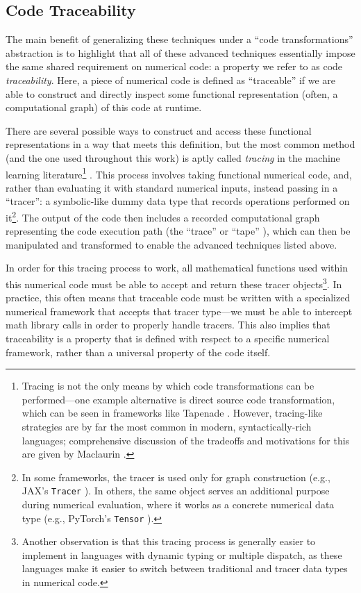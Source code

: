 
\subsection{Code Traceability}
\label{sec:traceability}

The main benefit of generalizing these techniques under a ``code transformations'' abstraction is to highlight that all of these advanced techniques essentially impose the same shared requirement on numerical code: a property we refer to as code \emph{traceability}. Here, a piece of numerical code is defined as ``traceable'' if we are able to construct and directly inspect some functional representation (often, a computational graph) of this code at runtime.

There are several possible ways to construct and access these functional representations in a way that meets this definition, but the most common method (and the one used throughout this work) is aptly called \emph{tracing} in the machine learning literature\footnote{Tracing is not the only means by which code transformations can be performed—one example alternative is direct source code transformation, which can be seen in frameworks like Tapenade \cite{tapenade}. However, tracing-like strategies are by far the most common in modern, syntactically-rich languages; comprehensive discussion of the tradeoffs and motivations for this are given by Maclaurin \cite{maclaurin_modeling_2016}.} \cite{jax, frostig_compiling_2018, baydin_automatic_2018}. This process involves taking functional numerical code, and, rather than evaluating it with standard numerical inputs, instead passing in a ``tracer'': a symbolic-like dummy data type that records operations performed on it\footnote{In some frameworks, the tracer is used only for graph construction (e.g., JAX's \texttt{Tracer} \cite{jax}). In others, the same object serves an additional purpose during numerical evaluation, where it works as a concrete numerical data type (e.g., PyTorch's \texttt{Tensor} \cite{paszke_pytorch_2019}).}. The output of the code then includes a recorded computational graph representing the code execution path (the ``trace'' or ``tape'' \cite{paszke_pytorch_2019}), which can then be manipulated and transformed to enable the advanced techniques listed above.

In order for this tracing process to work, all mathematical functions used within this numerical code must be able to accept and return these tracer objects\footnote{Another observation is that this tracing process is generally easier to implement in languages with dynamic typing or multiple dispatch, as these languages make it easier to switch between traditional and tracer data types in numerical code.}. In practice, this often means that traceable code must be written with a specialized numerical framework that accepts that tracer type—we must be able to intercept math library calls in order to properly handle tracers. This also implies that traceability is a property that is defined with respect to a specific numerical framework, rather than a universal property of the code itself.

